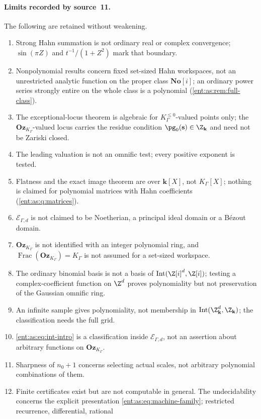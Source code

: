 \documentclass[11pt]{article}
\theoremstyle{plain}
\theoremstyle{plain}
\theoremstyle{plain}
\theoremstyle{definition}
\theoremstyle{definition}
\theoremstyle{definition}
\theoremstyle{definition}
\theoremstyle{remark}
\newcommand{\No}{\mathbf{No}}
\newcommand{\K}{K_\Gamma}\newcommand{\KD}{K_\Delta}
\newcommand{\kk}{\mathbf k}\newcommand{\PP}{\mathbb P}
\newcommand{\Oz}{\mathbf{Oz}}\newcommand{\Ed}{\mathcal E_{\Gamma,d}}
\newcommand{\Kle}{K_\Gamma^{\le0}}\DeclareMathOperator{\Jac}{Jac}
\newcommand{\Zk}{\Z_{\kk}}\newcommand{\OzK}{\Oz_{\K}}
\DeclareMathOperator{\Int}{Int}\DeclareMathOperator{\ct}{ct}
\begin{document}
\paragraph{Limits recorded by source~11.} The following are retained without
weakening.
\begin{enumerate}[label=(\arabic*),leftmargin=2em]
\item Strong Hahn summation is not ordinary real or complex convergence;
$\sin(\pi Z)$ and $t^{-1}/(1+Z^2)$ mark that boundary.
\item Nonpolynomial results concern fixed set-sized Hahn workspaces, not an
unrestricted analytic function on the proper class $\No[i]$; an ordinary power
series strongly entire on the whole class is a polynomial
(\cref{ent:as:rem:full-class}).
\item The exceptional-locus theorem is algebraic for $\Kle$-valued points only;
the $\OzK$-valued locus carries the residue condition $\pg_0(\mathbf s)\in\Zk$
and need not be Zariski closed.
\item The leading valuation is not an omnific test; every positive exponent is
tested.
\item Flatness and the exact image theorem are over $\kk[X]$, not $\K[X]$;
nothing is claimed for polynomial matrices with Hahn coefficients
(\cref{ent:as:q:matrices}).
\item $\Ed$ is not claimed to be Noetherian, a principal ideal domain or a
B\'ezout domain.
\item $\OzK$ is not identified with an integer polynomial ring, and
$\operatorname{Frac}(\OzK)=\K$ is not assumed for a set-sized workspace.
\item The ordinary binomial basis is not a basis of $\Int(\Z[i]^d,\Z[i])$;
testing a complex-coefficient function on $\Z^d$ proves polynomiality but not
preservation of the Gaussian omnific ring.
\item An infinite sample gives polynomiality, not membership in
$\Int(\Zk^d,\Zk)$; the classification needs the full grid.
\item \eqref{ent:as:eq:int-intro} is a classification inside $\Ed$, not an
assertion about arbitrary functions on $\OzK$.
\item Sharpness of $n_0+1$ concerns selecting actual scales, not arbitrary
polynomial combinations of them.
\item Finite certificates exist but are not computable in general. The
undecidability concerns the explicit presentation
\eqref{ent:as:eq:machine-family}; restricted recurrence, differential, rational

\end{enumerate}
\end{document}
